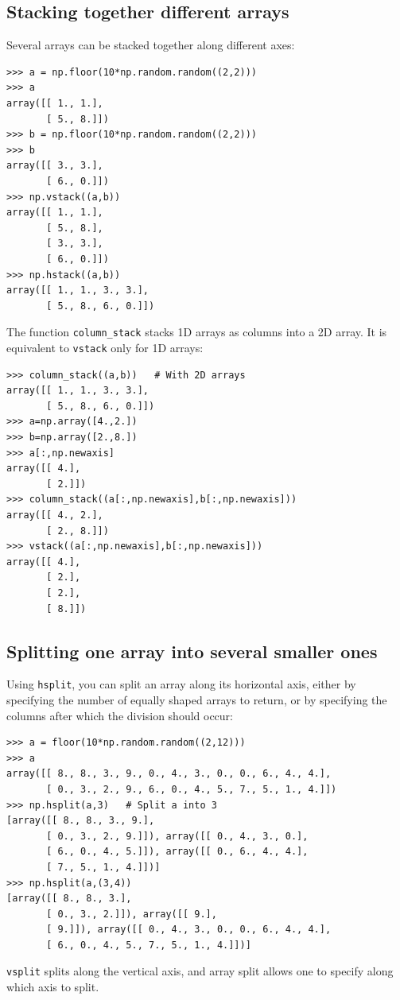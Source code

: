 \documentclass[12pt]{article}
\begin{document}
\subsection{Stacking together different arrays}
Several arrays can be stacked together along different axes:
\footnotesize
\begin{Verbatim}[frame=single]
>>> a = np.floor(10*np.random.random((2,2)))
>>> a
array([[ 1., 1.],
       [ 5., 8.]])
>>> b = np.floor(10*np.random.random((2,2)))
>>> b
array([[ 3., 3.],
       [ 6., 0.]])
>>> np.vstack((a,b))
array([[ 1., 1.],
       [ 5., 8.],
       [ 3., 3.],
       [ 6., 0.]])
>>> np.hstack((a,b))
array([[ 1., 1., 3., 3.],
       [ 5., 8., 6., 0.]])
\end{Verbatim}
\normalsize
The function \verb!column_stack! stacks 1D arrays as columns into a 2D array. It is equivalent to \texttt{vstack} only for 1D arrays:
\footnotesize
\begin{Verbatim}[frame=single]
>>> column_stack((a,b))   # With 2D arrays
array([[ 1., 1., 3., 3.],
       [ 5., 8., 6., 0.]])
>>> a=np.array([4.,2.])
>>> b=np.array([2.,8.])
>>> a[:,np.newaxis]  
array([[ 4.],
       [ 2.]])
>>> column_stack((a[:,np.newaxis],b[:,np.newaxis]))
array([[ 4., 2.],
       [ 2., 8.]])
>>> vstack((a[:,np.newaxis],b[:,np.newaxis])) 
array([[ 4.],
       [ 2.],
       [ 2.],
       [ 8.]])
\end{Verbatim}
\normalsize

\subsection{Splitting one array into several smaller ones}
Using \texttt{hsplit}, you can split an array along its horizontal axis, either by specifying the number of equally shaped arrays to return, or by specifying the columns after which the division should occur:
\footnotesize
\begin{Verbatim}[frame=single]
>>> a = floor(10*np.random.random((2,12)))
>>> a
array([[ 8., 8., 3., 9., 0., 4., 3., 0., 0., 6., 4., 4.],
       [ 0., 3., 2., 9., 6., 0., 4., 5., 7., 5., 1., 4.]])
>>> np.hsplit(a,3)   # Split a into 3
[array([[ 8., 8., 3., 9.],
       [ 0., 3., 2., 9.]]), array([[ 0., 4., 3., 0.],
       [ 6., 0., 4., 5.]]), array([[ 0., 6., 4., 4.],
       [ 7., 5., 1., 4.]])]
>>> np.hsplit(a,(3,4))   
[array([[ 8., 8., 3.],
       [ 0., 3., 2.]]), array([[ 9.],
       [ 9.]]), array([[ 0., 4., 3., 0., 0., 6., 4., 4.],
       [ 6., 0., 4., 5., 7., 5., 1., 4.]])]
\end{Verbatim}
\normalsize
\texttt{vsplit} splits along the vertical axis, and array split allows one to specify along which axis to split.
\end{document}

